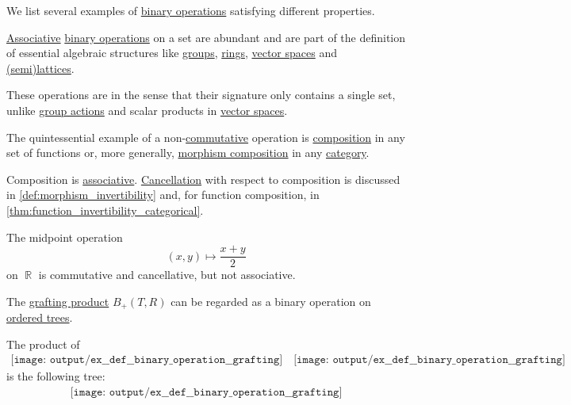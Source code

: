 \begin{example}\label{ex:def:binary_operation}
  We list several examples of \hyperref[def:binary_operation]{binary operations} satisfying different properties.

  \begin{thmenum}
     \hyperref[eq:def:binary_operation/associative]{Associative} \hyperref[def:binary_operation]{binary operations} on a set are abundant and are part of the definition of essential algebraic structures like \hyperref[def:group]{groups}, \hyperref[def:ring]{rings}, \hyperref[def:vector_space]{vector spaces} and \hyperref[def:lattice]{(semi)lattices}.

    These operations are  in the sense that their signature only contains a single set, unlike \hyperref[def:group_action]{group actions} and scalar products in \hyperref[def:vector_space]{vector spaces}.

     The quintessential example of a non-\hyperref[def:binary_operation/commutative]{commutative} operation is \hyperref[def:set_valued_map/composition]{composition} in any set of functions or, more generally, \hyperref[def:category/composition]{morphism composition} in any \hyperref[def:category]{category}.

    Composition is \hyperref[def:binary_operation/associative]{associative}. \hyperref[def:binary_operation/cancellative]{Cancellation} with respect to composition is discussed in \cref{def:morphism_invertibility} and, for function composition, in \cref{thm:function_invertibility_categorical}.

     The midpoint operation
    \begin{equation*}
      (x, y) \mapsto \dfrac {x + y} 2
    \end{equation*}
    on \( \BbbR \) is commutative and cancellative, but not associative.

     The \hyperref[def:ordered_tree_grafting_product]{grafting product} \( B_+(T, R) \) can be regarded as a binary operation on \hyperref[def:ordered_tree]{ordered trees}.

    The product of
    \begin{equation*}
      \begin{aligned}
        \texttt{[image: output/ex\_\_def\_\_binary\_operation\_\_grafting]}
        \quad
        \texttt{[image: output/ex\_\_def\_\_binary\_operation\_\_grafting]}
      \end{aligned}
    \end{equation*}
    is the following tree:
    \begin{equation*}
      \begin{aligned}
        \texttt{[image: output/ex\_\_def\_\_binary\_operation\_\_grafting]}
      \end{aligned}
    \end{equation*}


\end{thmenum}
\end{example}
